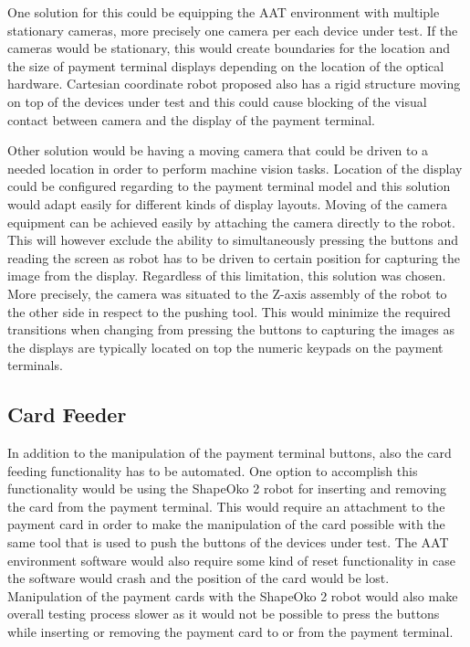 One solution for this could be equipping the AAT environment with multiple stationary cameras, more precisely one camera per each device under test. If the cameras would be stationary, this would create boundaries for the location and the size of payment terminal displays depending on the location of the optical hardware. Cartesian coordinate robot proposed also has a rigid structure moving on top of the devices under test and this could cause blocking of the visual contact between camera and the display of the payment terminal.

Other solution would be having a moving camera that could be driven to a needed location in order to perform machine vision tasks. Location of the display could be configured regarding to the payment terminal model and this solution would adapt easily for different kinds of display layouts. Moving of the camera equipment can be achieved easily by attaching the camera directly to the robot. This will however exclude the ability to simultaneously pressing the buttons and reading the screen as robot has to be driven to certain position for capturing the image from the display. Regardless of this limitation, this solution was chosen. More precisely, the camera was situated to the Z-axis assembly of the robot to the other side in respect to the pushing tool. This would minimize the required transitions when changing from pressing the buttons to capturing the images as the displays are typically located on top the numeric keypads on the payment terminals.

\FloatBarrier
\subsection{Card Feeder}
\label{subsection:Card feeder}

In addition to the manipulation of the payment terminal buttons, also the card feeding functionality has to be automated. One option to accomplish this functionality would be using the ShapeOko 2 robot for inserting and removing the card from the payment terminal. This would require an attachment to the payment card in order to make the manipulation of the card possible with the same tool that is used to push the buttons of the devices under test. The AAT environment software would also require some kind of reset functionality in case the software would crash and the position of the card would be lost. Manipulation of the payment cards with the ShapeOko 2 robot would also make overall testing process slower as it would not be possible to press the buttons while inserting or removing the payment card to or from the payment terminal.

